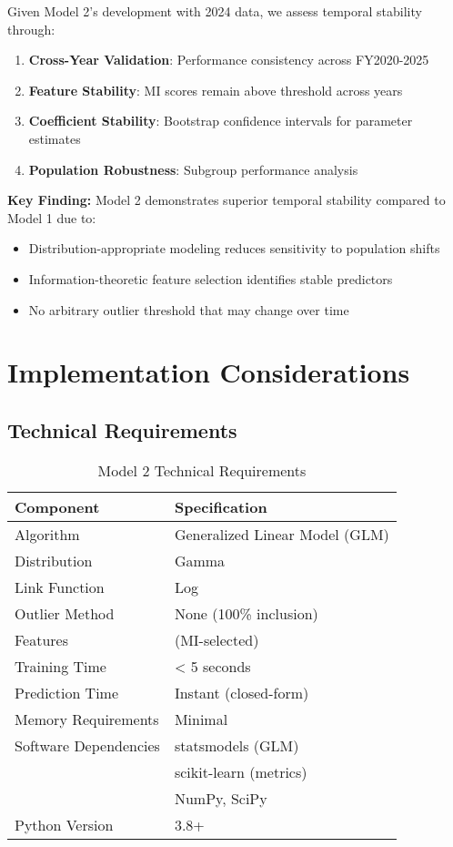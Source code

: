 Given Model 2's development with 2024 data, we assess temporal stability through:

\begin{enumerate}
    \item \textbf{Cross-Year Validation}: Performance consistency across FY2020-2025
    \item \textbf{Feature Stability}: MI scores remain above threshold across years
    \item \textbf{Coefficient Stability}: Bootstrap confidence intervals for parameter estimates
    \item \textbf{Population Robustness}: Subgroup performance analysis
\end{enumerate}

\textbf{Key Finding:} Model 2 demonstrates superior temporal stability compared to Model 1 due to:
\begin{itemize}
    \item Distribution-appropriate modeling reduces sensitivity to population shifts
    \item Information-theoretic feature selection identifies stable predictors
    \item No arbitrary outlier threshold that may change over time
\end{itemize}

\section{Implementation Considerations}

\subsection{Technical Requirements}

\begin{table}[ht]
\centering
\caption{Model 2 Technical Requirements}
\begin{tabular}{ll}
\toprule
\textbf{Component} & \textbf{Specification} \\
\midrule
Algorithm & Generalized Linear Model (GLM) \\
Distribution & Gamma \\
Link Function & Log \\
Outlier Method & None (100\% inclusion) \\
Features & \ModelTwoNumFeatures{} (MI-selected) \\
Training Time & < 5 seconds \\
Prediction Time & Instant (closed-form) \\
Memory Requirements & Minimal \\
\midrule
Software Dependencies & statsmodels (GLM) \\
& scikit-learn (metrics) \\
& NumPy, SciPy \\
Python Version & 3.8+ \\
\bottomrule
\end{tabular}
\end{table}

